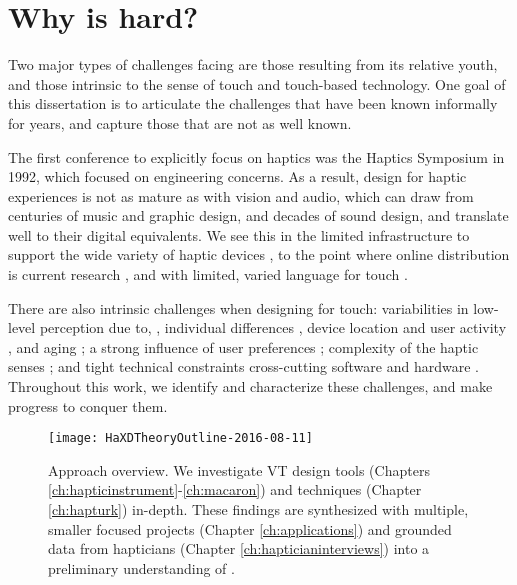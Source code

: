 \section{Why is \haxd hard?}
Two major types of challenges facing \haxd are those resulting from its relative youth, and those intrinsic to the sense of touch and touch-based technology.
One goal of this dissertation is to articulate the challenges that have been known informally for years, and capture those that are not as well known.

The first conference to explicitly focus on haptics was the Haptics Symposium in 1992, which focused on engineering concerns.
As a result, design for haptic experiences is not as mature as with vision and audio, which can draw from centuries of music and graphic design, and decades of sound design, and translate well to their digital equivalents.
We see this in the limited infrastructure to support the wide variety of haptic devices \cite{Hayward2007}, to the point where online distribution is current research \cite{AbdurRahman2010}, and with limited, varied language for touch \cite{Jansson-Boyd2011}.

There are also intrinsic challenges when designing for touch:
variabilities in low-level perception due to, \eg, individual differences \cite{Lo1984}, device location and user activity \cite{Karuei2011}, and aging \cite{Stevens1996,Stevens1992};
a strong influence of user preferences \cite{Seifi2014,Seifi2015};
complexity of the haptic senses \cite{ChoiKuchenbecker2013,Lederman2009survey,Kandel2000};
and tight technical constraints cross-cutting software and hardware \cite{levitin2000perception,Hayward2007}.
Throughout this work, we identify and characterize these challenges, and make progress to conquer them.




\begin{figure}[htbp]
\begin{center}
\texttt{[image: HaXDTheoryOutline-2016-08-11]}
\caption{Approach overview. We investigate VT design tools (Chapters \ref{ch:hapticinstrument}-\ref{ch:macaron}) and techniques (Chapter \ref{ch:hapturk}) in-depth. These findings are synthesized with multiple, smaller focused projects (Chapter \ref{ch:applications}) and grounded data from hapticians (Chapter \ref{ch:hapticianinterviews}) into a preliminary understanding of \haxd.}
\label{fig:intro:methodologyoverview}
\end{center}
\end{figure}



